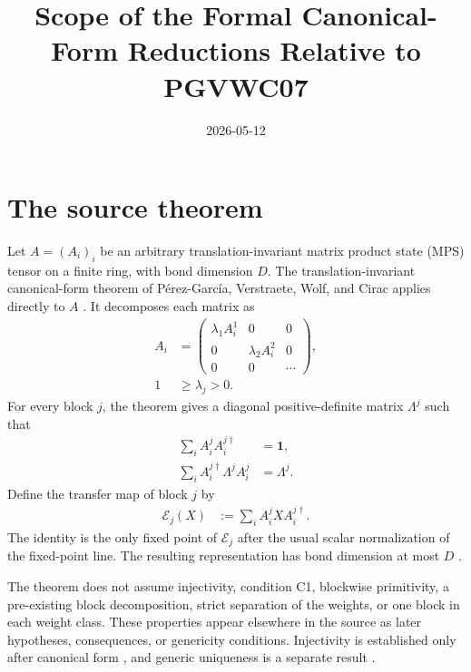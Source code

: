 \documentclass{article}
\title{Scope of the Formal Canonical-Form Reductions Relative to PGVWC07}
\author{}
\date{2026-05-12}
\begin{document}
\maketitle
{}

\section{The source theorem}

Let $A=(A_i)_i$ be an arbitrary translation-invariant matrix product state
(MPS) tensor on a finite ring, with bond dimension $D$. The
translation-invariant canonical-form theorem of P\'erez-Garc\'ia, Verstraete,
Wolf, and Cirac applies directly to $A$
\cite[Theorem~\texttt{Th:TIcanonical}, lines~742--763]{PerezGarcia2007MPSReps}.
It decomposes each matrix as
\begin{align}
    A_i
        &=
        \begin{pmatrix}
            \lambda_1 A_i^1 & 0 & 0 \\
            0 & \lambda_2 A_i^2 & 0 \\
            0 & 0 & \cdots
        \end{pmatrix},
    \label{eq:pgvwc07_ti_canonical_form_scope_block_decomposition}\\
    1
        &\geq \lambda_j>0.
    \label{eq:pgvwc07_ti_canonical_form_scope_positive_weights}
\end{align}
For every block $j$, the theorem gives a diagonal positive-definite matrix
$\Lambda^j$ such that
\begin{align}
    \sum_i A_i^j A_i^{j\dagger}
        &= \mathbf{1},
    \label{eq:pgvwc07_ti_canonical_form_scope_unital_block}\\
    \sum_i A_i^{j\dagger}\Lambda^j A_i^j
        &= \Lambda^j.
    \label{eq:pgvwc07_ti_canonical_form_scope_dual_fixed_point}
\end{align}
Define the transfer map of block $j$ by
\begin{align}
    \mathcal{E}_j(X)
        &:= \sum_i A_i^j X A_i^{j\dagger}.
    \label{eq:pgvwc07_ti_canonical_form_scope_transfer_map}
\end{align}
The identity is the only fixed point of $\mathcal{E}_j$ after the usual scalar
normalization of the fixed-point line. The resulting representation has bond
dimension at most $D$
\cite[Theorem~\texttt{Th:TIcanonical}, lines~742--763]{PerezGarcia2007MPSReps}.

The theorem does not assume injectivity, condition C1, blockwise primitivity, a
pre-existing block decomposition, strict separation of the weights, or one
block in each weight class. These properties appear elsewhere in the source as
later hypotheses, consequences, or genericity conditions. Injectivity is
established only after canonical form
\cite[Proposition~\texttt{prop-inj}, lines~911--950]{PerezGarcia2007MPSReps},
and generic uniqueness is a separate result
\cite[Theorem~\texttt{thm-uniq}, lines~1002--1015]{PerezGarcia2007MPSReps}.
\end{document}
